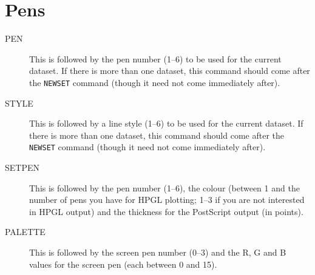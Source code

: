 \section{Pens}
\begin{description}
\item[PEN] This is followed by the pen number (1--6) to be used for the current
dataset. If there is more than one dataset, this command should come after the
{\tt NEWSET} command (though it need not come immediately after).
\item[STYLE] This is followed by a line style (1--6) to be used for the current
dataset. If there is more than one dataset, this command should come after the
{\tt NEWSET} command (though it need not come immediately after).
\item[SETPEN] This is followed by the pen number (1--6), the colour (between  1 and 
the number of pens you have for HPGL plotting; 1--3 if you are not interested in HPGL 
output) and the thickness for the PostScript output (in points).
\item[PALETTE] This is followed by the screen pen number (0--3) and the R, G and B 
values for the screen pen (each between 0 and 15).
\end{description}

